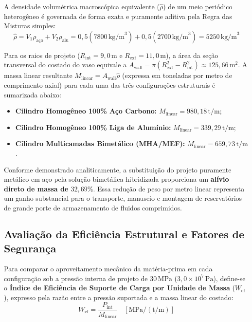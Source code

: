 A densidade volumétrica macroscópica equivalente ($\hat{\rho}$) de um meio periódico heterogêneo é governada de forma exata e puramente aditiva pela Regra das Misturas simples:
\begin{equation}
  \hat{\rho} = V_1 \rho_{\text{aço}} + V_2 \rho_{\text{alu}} = 0,5 (7800 \, \text{kg/m}^3) + 0,5 (2700 \, \text{kg/m}^3) = 5250 \, \text{kg/m}^3
  \label{eq:densidade_efetiva_sec55}
\end{equation}

Para os raios de projeto ($R_{\text{int}} = 9,0 \, \text{m}$ e $R_{\text{ext}} = 11,0 \, \text{m}$), a área da seção transversal do costado do vaso equivale a $A_{\text{wall}} = \pi (R_{\text{ext}}^2 - R_{\text{int}}^2) \approx 125,66 \, \text{m}^2$. A massa linear resultante $M_{\text{linear}} = A_{\text{wall}} \hat{\rho}$ (expressa em toneladas por metro de comprimento axial) para cada uma das três configurações estruturais é sumarizada abaixo:
\begin{itemize}
  \item \textbf{Cilindro Homogêneo 100\% Aço Carbono:} $M_{\text{linear}} = 980,18 \, \text{t/m}$;
  \item \textbf{Cilindro Homogêneo 100\% Liga de Alumínio:} $M_{\text{linear}} = 339,29 \, \text{t/m}$;
  \item \textbf{Cilindro Multicamadas Bimetálico (MHA/MEF):} $M_{\text{linear}} = 659,73 \, \text{t/m}$.
\end{itemize}

Conforme demonstrado analiticamente, a substituição do projeto puramente metálico em aço pela solução bimetálica hibridizada proporciona um \textbf{alívio direto de massa de $32,69\%$}. Essa redução de peso por metro linear representa um ganho substancial para o transporte, manuseio e montagem de reservatórios de grande porte de armazenamento de fluidos comprimidos.

\subsection{Avaliação da Eficiência Estrutural e Fatores de Segurança}

Para comparar o aproveitamento mecânico da matéria-prima em cada configuração sob a pressão interna de projeto de $30 \, \text{MPa}$ ($3,0 \times 10^7 \, \text{Pa}$), define-se o \textbf{Índice de Eficiência de Suporte de Carga por Unidade de Massa} ($W_{\text{ef}}$), expresso pela razão entre a pressão suportada e a massa linear do costado:
\begin{equation}
  W_{\text{ef}} = \frac{P_{\text{int}}}{M_{\text{linear}}} \quad [\text{MPa} / (\text{t/m})]
  \label{eq:indice_eficiencia_massa}
\end{equation}

